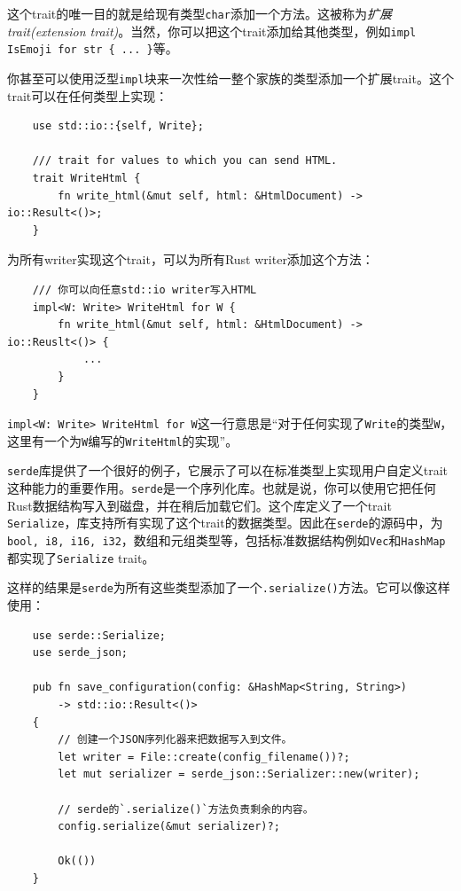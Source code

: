 这个trait的唯一目的就是给现有类型\texttt{char}添加一个方法。这被称为\emph{扩展trait(extension trait)}。当然，你可以把这个trait添加给其他类型，例如\texttt{impl IsEmoji for str \{ ... \}}等。

你甚至可以使用泛型\texttt{impl}块来一次性给一整个家族的类型添加一个扩展trait。这个trait可以在任何类型上实现：
\begin{verbatim}
    use std::io::{self, Write};

    /// trait for values to which you can send HTML.
    trait WriteHtml {
        fn write_html(&mut self, html: &HtmlDocument) -> io::Result<()>;
    }
\end{verbatim}

为所有writer实现这个trait，可以为所有Rust writer添加这个方法：
\begin{verbatim}
    /// 你可以向任意std::io writer写入HTML
    impl<W: Write> WriteHtml for W {
        fn write_html(&mut self, html: &HtmlDocument) -> io::Reuslt<()> {
            ...
        }
    }
\end{verbatim}

\texttt{impl<W: Write> WriteHtml for W}这一行意思是“对于任何实现了\texttt{Write}的类型\texttt{W}，这里有一个为\texttt{W}编写的\texttt{WriteHtml}的实现”。

\texttt{serde}库提供了一个很好的例子，它展示了可以在标准类型上实现用户自定义trait这种能力的重要作用。\texttt{serde}是一个序列化库。也就是说，你可以使用它把任何Rust数据结构写入到磁盘，并在稍后加载它们。这个库定义了一个trait \texttt{Serialize}，库支持所有实现了这个trait的数据类型。因此在\texttt{serde}的源码中，为\texttt{bool, i8, i16, i32}，数组和元组类型等，包括标准数据结构例如\texttt{Vec}和\texttt{HashMap}都实现了\texttt{Serialize} trait。

这样的结果是\texttt{serde}为所有这些类型添加了一个\texttt{.serialize()}方法。它可以像这样使用：
\begin{verbatim}
    use serde::Serialize;
    use serde_json;

    pub fn save_configuration(config: &HashMap<String, String>) 
        -> std::io::Result<()>
    {
        // 创建一个JSON序列化器来把数据写入到文件。
        let writer = File::create(config_filename())?;
        let mut serializer = serde_json::Serializer::new(writer);

        // serde的`.serialize()`方法负责剩余的内容。
        config.serialize(&mut serializer)?;

        Ok(())
    }
\end{verbatim}


